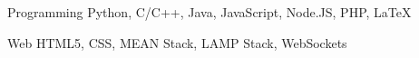 


\begin{cvskills}


\cvskill
{Programming} %
{Python, C/C++, Java, JavaScript, Node.JS, PHP, LaTeX} %


\cvskill
{Web} %
{HTML5, CSS, MEAN Stack, LAMP Stack, WebSockets} %




\end{cvskills}